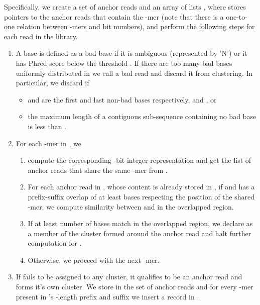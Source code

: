\documentclass[a4paper]{article}
\begin{document}
Specifically, we create a set of anchor reads  and an array
of  lists ,
where  stores pointers to the anchor reads that contain the -mer 
(note that there is a one-to-one relation between -mers and  bit numbers),
and perform the following steps for each read  in the library.


\begin{enumerate}
  \setlength{\itemsep}{1pt}
  \setlength{\parskip}{0pt}
  \setlength{\parsep}{0pt}

\item A base  is defined as a bad base if it is ambiguous
(represented by 'N') or it has Phred score below the threshold
. If there are too many bad bases uniformly distributed in 
we call  a bad read and discard it from clustering.
In particular, we discard  if

\begin{itemize}
\item  and  are the first and last non-bad bases
respectively, and , or



\item the maximum length of a contiguous sub-sequence containing no bad base is less than .

\end{itemize}

\item For each -mer in , we

  \begin{enumerate}
  \setlength{\itemsep}{1pt}
  \setlength{\parskip}{0pt}
  \setlength{\parsep}{0pt}
  \item compute the corresponding -bit integer
  representation  and get the list of anchor reads that share
  the same -mer from .
  \item For each anchor read  in ,
  whose content is already stored in ,
  if  and  has a prefix-suffix overlap of at least  bases
  respecting the position
    of the shared -mer, we compute similarity between  and 
    in the overlapped region.
  \item If at least  number of bases match
  in the overlapped region,
  we declare  as a member of the cluster formed around the
    anchor read  and halt further computation for .
  \item Otherwise, we proceed with the next -mer.
  \end{enumerate}

\item If  fails to be assigned to any cluster, it
qualifies to be an anchor read and forms it's own cluster. We store 
in the set of anchor reads  and
for every -mer  present in 's
-length prefix and suffix we insert a record in .
\end{enumerate}
\end{document}
